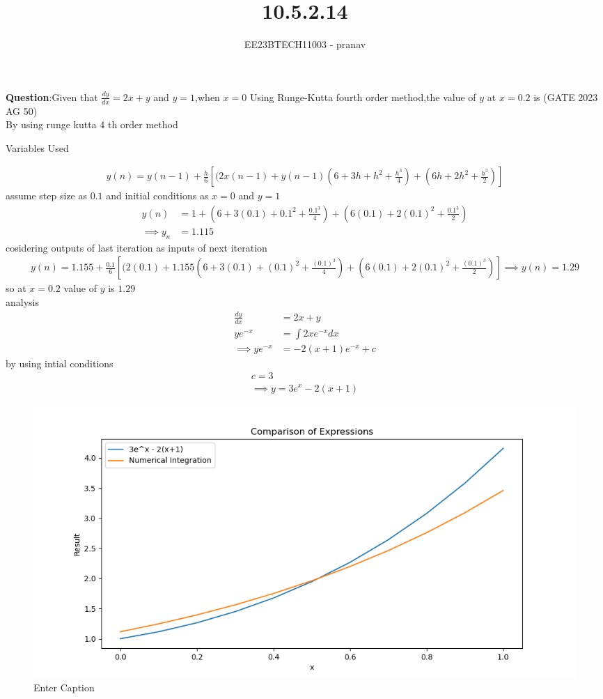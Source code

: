 \documentclass[journal,12pt,twocolumn]{IEEEtran}
\theoremstyle{remark}
\begin{document}

\vspace{3cm}

\title{10.5.2.14}
\author{EE23BTECH11003 - pranav}
\maketitle
\newpage

\bigskip
\renewcommand{\thefigure}{\arabic{figure}}
\renewcommand{\thetable}{\arabic{table}}

\textbf{Question}:Given that $\frac{dy}{dx}=2x+y$ and $y=1$,when $x=0$ Using Runge-Kutta fourth order method,the value of $y$ at $x=0.2$ is \hfill(GATE 2023 AG 50) 
\solution\\
By using runge kutta 4 th order method\\
\begin{table}[h]
    \centering
    
    \caption{Variables Used}
    \label{ag:50}
\end{table}
\begin{align}
y(n)=y(n-1)+\frac{h}{6}[(2x(n-1)+y(n-1)(6+3h+h^2+\frac{h^3}{4})+(6h+2h^2+\frac{h^3}{2})]
\end{align}
assume step size as $0.1$ and initial conditions as $x=0$ and $y=1$\\
\begin{align}
y(n)&=1+(6+3(0.1)+0.1^2+\frac{0.1^3}{4})+(6(0.1)+2(0.1)^2+\frac{0.1^3}{2})\\
\implies y_{n}&=1.115
\end{align}
cosidering outputs of last iteration as inputs of next iteration\\
\begin{align}
y(n)=1.155+\frac{0.1}{6}[(2(0.1)+1.155(6+3(0.1)+(0.1)^2+\frac{(0.1)^3}{4})+(6(0.1)+2(0.1)^2+\frac{(0.1)^3}{2})]
\implies y(n)=1.29
\end{align}
so at $x=0.2$ value of $y$ is $1.29$\\
analysis
\begin{align}
\frac{dy}{dx}&=2x+y\\
ye^{-x}&=\int2xe^{-x}dx\\
\implies ye^{-x}&=-2(x+1)e^{-x}+c
\end{align}
by using intial conditions
\begin{align}
c=3\\
\implies y=3e^x-2(x+1)
\end{align}
\newpage
\begin{figure}
    \centering
    \includegraphics[width=1.1\linewidth]{figs/grap.png}
    \caption{Enter Caption}
\end{figure}
\end{document}

